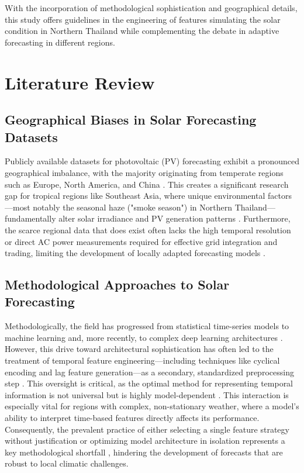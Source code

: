 \documentclass[conference]{IEEEtran}
\begin{document}
	With the incorporation of methodological sophistication and geographical details, this study offers guidelines in the engineering of features simulating the solar condition in Northern Thailand while complementing the debate in adaptive forecasting in different regions.
	
	\section{Literature Review}
	
	\subsection{Geographical Biases in Solar Forecasting Datasets}
	Publicly available datasets for photovoltaic (PV) forecasting exhibit a pronounced geographical imbalance, with the majority originating from temperate regions such as Europe, North America, and China \cite{EuropeanDataset2019, NREL2018, ChinaSolar2020}. This creates a significant research gap for tropical regions like Southeast Asia, where unique environmental factors—most notably the seasonal haze ("smoke season") in Northern Thailand—fundamentally alter solar irradiance and PV generation patterns \cite{Amnuaylojaroen2020, ASEANEnergy2022}. Furthermore, the scarce regional data that does exist often lacks the high temporal resolution or direct AC power measurements required for effective grid integration and trading, limiting the development of locally adapted forecasting models \cite{Seng2021, Ahmed2020}.
	
	\subsection{Methodological Approaches to Solar Forecasting}
	Methodologically, the field has progressed from statistical time-series models to machine learning and, more recently, to complex deep learning architectures \cite{LeCun2015, Hochreiter1997}. However, this drive toward architectural sophistication has often led to the treatment of temporal feature engineering—including techniques like cyclical encoding and lag feature generation—as a secondary, standardized preprocessing step \cite{Cerqueira2020, BoxJenkins1976}. This oversight is critical, as the optimal method for representing temporal information is not universal but is highly model-dependent \cite{Bommes2021}. This interaction is especially vital for regions with complex, non-stationary weather, where a model's ability to interpret time-based features directly affects its performance. Consequently, the prevalent practice of either selecting a single feature strategy without justification or optimizing model architecture in isolation represents a key methodological shortfall \cite{Wang2019}, hindering the development of forecasts that are robust to local climatic challenges.
	
\end{document}
